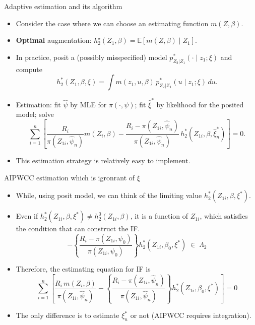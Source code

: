 \documentclass[xcolor=dvipsnames,aspectratio=169]{beamer}
\newcommand{\E}{\mathbb{E}}
\newcommand{\1}{\mathbbm{1}}
\begin{document}
\begin{frame}{Adaptive estimation and its algorithm}
  \begin{itemize}
    \item Consider the case where we can \alert{choose} an estimating function $m(Z,\beta)$.
    \item \textbf{Optimal} augmentation: $h_2^\star(Z_1,\beta)=\E\!\left[m(Z,\beta)\mid Z_1\right]$.
    \item In practice, posit a (possibly misspecified) model $p^\ast_{Z_2|Z_1}(\cdot\mid z_1;\xi)$ and compute
    \[
      h_2^\ast(Z_1,\beta,\xi)=\int m(z_1,u,\beta)\,p^\ast_{Z_2|Z_1}(u\mid z_1;\xi)\,du.
    \]
    \item Estimation: fit $\hat\psi$ by MLE for $\pi(\cdot,\psi)$; fit $\hat\xi^\ast$ by likelihood for the posited model; solve
    \[
      \sum_{i=1}^n\left[\frac{R_i}{\pi(Z_{1i},\hat\psi_n)}m(Z_i,\beta)
      -\frac{R_i-\pi(Z_{1i},\hat\psi_n)}{\pi(Z_{1i},\hat\psi_n)}\,h_2^\ast(Z_{1i},\beta,\hat\xi_n^\ast)\right]=0.
    \]
    \item This estimation strategy is relatively easy to implement.
  \end{itemize}
\end{frame}

\begin{frame}{AIPWCC estimation which is igronrant of $\xi$}
  \begin{itemize}
    \item While, using posit model, we can think of the limiting value $h_2^*(Z_{1i},\beta, \xi^*)$.
    \item Even if $h_2^*(Z_{1i},\beta, \xi^*)\neq h_2^0(Z_{1i},\beta)$, it is a function of $Z_{1i}$, which satisfies the condition that can construct the IF.
    \[
    -\left\{
  \frac{R_{i}-\pi(Z_{1i},\psi_{0})}{\pi(Z_{1i},\psi_{0})}
 \right\}
 h^{\ast}_{2}(Z_{1i},\beta_{0},\xi^{\ast})
 \;\in\;\Lambda_{2}
    \]
    \item Therefore, the estimating equation for IF is
    \[
    \sum_{i=1}^{n}
\left[
  \frac{R_{i}\,m(Z_{i},\beta)}{\pi(Z_{1i},\hat{\psi}_{n})}
  - \left\{
      \frac{R_{i}-\pi(Z_{1i},\hat{\psi}_{n})}{\pi(Z_{1i},\hat{\psi}_{n})}
    \right\}
    h^{\ast}_{2}(Z_{1i},\beta_{0},\xi^{\ast})
\right]
= 0
    \]
    \item The only difference is to estimate $\xi_n^*$ or not (AIPWCC requires integration).
  \end{itemize}
\end{frame}
\end{document}
